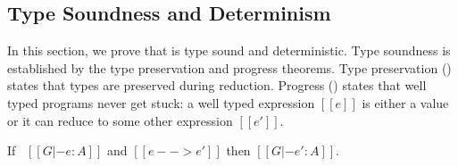 \subsection{Type Soundness and Determinism}
\label{sec:union:safety}

In this section, we prove that
\name is type sound and deterministic. Type soundness is established
by the type preservation and progress
theorems. Type preservation () states that
types are preserved during reduction. Progress
() states that well typed programs never get
stuck: a well typed expression $[[e]]$ is either a value or it can
reduce to some other expression $[[e']]$.

\begin{theorem}
\label{lemma:union:preservation}
  If \ $[[G |- e : A]]$ and $[[e --> e']]$ then $[[G |- e' : A]]$.
\end{theorem}





